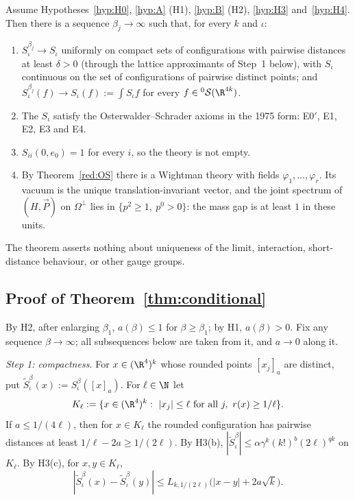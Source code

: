 \begin{theorem}[Theorem S]\label{thm:conditional}
Assume Hypotheses~\ref{hyp:H0}, \ref{hyp:A} (H1), \ref{hyp:B} (H2), \ref{hyp:H3} and~\ref{hyp:H4}. Then there is a sequence $\beta_j\to\infty$ such that, for every $k$ and $\iota$:
\begin{enumerate}
\item $S^{\beta_j}_\iota\to S_\iota$ uniformly on compact sets of configurations with pairwise distances at least $\delta>0$ (through the lattice approximants of Step~1 below), with $S_\iota$ continuous on the set of configurations of pairwise distinct points; and $S^{\beta_j}_\iota(f)\to S_\iota(f):=\int S_\iota f$ for every $f\in{}^0\mathcal S(\R^{4k})$.
\item The $S_\iota$ satisfy the Osterwalder--Schrader axioms in the 1975 form: E0$'$, E1, E2, E3 and E4.
\item $S_{ii}(0,e_0)=1$ for every $i$, so the theory is not empty.
\item By Theorem~\ref{red:OS} there is a Wightman theory with fields $\varphi_1,\dots,\varphi_r$. Its vacuum is the unique translation-invariant vector, and the joint spectrum of $(H,\vec P)$ on $\Omega^\perp$ lies in $\{p^2\ge1,\ p^0>0\}$: the mass gap is at least $1$ in these units.
\end{enumerate}
The theorem asserts nothing about uniqueness of the limit, interaction, short-distance behaviour, or other gauge groups.
\end{theorem}

\subsection{Proof of Theorem~\ref{thm:conditional}}\label{red:S-proof}

By H2, after enlarging $\beta_1$, $a(\beta)\le1$ for $\beta\ge\beta_1$; by H1, $a(\beta)>0$. Fix any sequence $\beta\to\infty$; all subsequences below are taken from it, and $a\to0$ along it.

\emph{Step 1: compactness.} For $x\in(\R^4)^k$ whose rounded points $[x_j]_a$ are distinct, put $\tilde S^\beta_\iota(x):=S^\beta_\iota([x]_a)$. For $\ell\in\N$ let
\[
  K_\ell:=\{x\in(\R^4)^k:\ |x_j|\le\ell\text{ for all }j,\ r(x)\ge1/\ell\}.
\]
If $a\le1/(4\ell)$, then for $x\in K_\ell$ the rounded configuration has pairwise distances at least $1/\ell-2a\ge1/(2\ell)$. By H3(b), $|\tilde S^\beta_\iota|\le\alpha\gamma^k(k!)^b(2\ell)^{qk}$ on $K_\ell$. By H3(c), for $x,y\in K_\ell$,
\begin{equation}\label{red:asym-eq}
  |\tilde S^\beta_\iota(x)-\tilde S^\beta_\iota(y)|\le L_{k,1/(2\ell)}\bigl(|x-y|+2a\sqrt k\bigr).
\end{equation}

